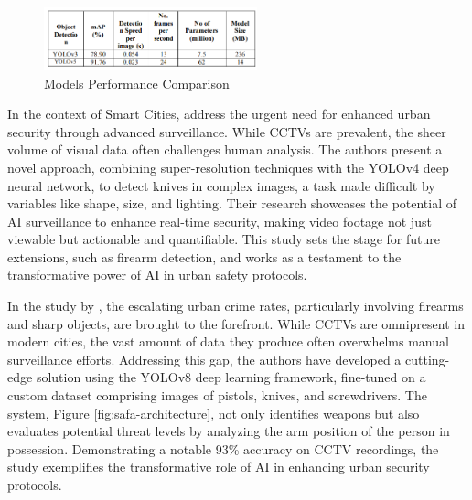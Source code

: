 \begin{figure}[h]
    \centering 
    \includegraphics[width=0.55\textwidth]{figs/performance-Thangaraj.png} 
    \caption{\citet{rfc5} Models Performance Comparison}
    \label{fig:performance-Thangaraj}
\end{figure}

In the context of Smart Cities, \citet{rfc18} address the urgent need for enhanced urban security through advanced surveillance. While CCTVs are prevalent, the sheer volume of visual data often challenges human analysis. The authors present a novel approach, combining super-resolution techniques with the YOLOv4 deep neural network, to detect knives in complex images, a task made difficult by variables like shape, size, and lighting. Their research showcases the potential of AI surveillance to enhance real-time security, making video footage not just viewable but actionable and quantifiable. This study sets the stage for future extensions, such as firearm detection, and works as a testament to the transformative power of AI in urban safety protocols.

In the study by \citet{rfc17}, the escalating urban crime rates, particularly involving firearms and sharp objects, are brought to the forefront. While CCTVs are omnipresent in modern cities, the vast amount of data they produce often overwhelms manual surveillance efforts. Addressing this gap, the authors have developed a cutting-edge solution using the YOLOv8 deep learning framework, fine-tuned on a custom dataset comprising images of pistols, knives, and screwdrivers. The system, Figure \ref{fig:safa-architecture}, not only identifies weapons but also evaluates potential threat levels by analyzing the arm position of the person in possession. Demonstrating a notable 93\% accuracy on CCTV recordings, the study exemplifies the transformative role of AI in enhancing urban security protocols.

